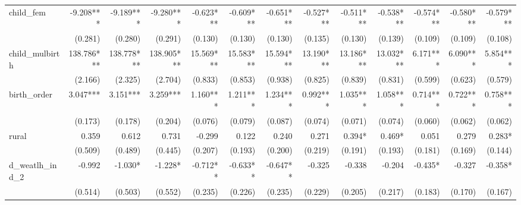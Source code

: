 \begin{tabular}{lrrrrrrrrrrrr}
child\_fem                                  &    -9.208*** &    -9.189*** &    -9.280*** &    -0.623*** &    -0.609*** &    -0.651*** &    -0.527*** &    -0.511*** &    -0.538*** &    -0.574*** &    -0.580*** &    -0.579*** \\ 
                                            &      (0.281) &      (0.280) &      (0.291) &      (0.130) &      (0.130) &      (0.130) &      (0.135) &      (0.130) &      (0.139) &      (0.109) &      (0.109) &      (0.108) \\ 
child\_mulbirth                             &   138.786*** &   138.778*** &   138.905*** &    15.569*** &    15.583*** &    15.594*** &    13.190*** &    13.186*** &    13.032*** &     6.171*** &     6.090*** &     5.854*** \\ 
                                            &      (2.166) &      (2.325) &      (2.704) &      (0.833) &      (0.853) &      (0.938) &      (0.825) &      (0.839) &      (0.831) &      (0.599) &      (0.623) &      (0.579) \\ 
birth\_order                                &     3.047*** &     3.151*** &     3.259*** &     1.160*** &     1.211*** &     1.234*** &     0.992*** &     1.035*** &     1.058*** &     0.714*** &     0.722*** &     0.758*** \\ 
                                            &      (0.173) &      (0.178) &      (0.204) &      (0.076) &      (0.079) &      (0.087) &      (0.074) &      (0.071) &      (0.074) &      (0.060) &      (0.062) &      (0.062) \\ 
rural                                       &        0.359 &        0.612 &        0.731 &       -0.299 &        0.122 &        0.240 &        0.271 &       0.394* &       0.469* &        0.051 &        0.279 &       0.283* \\ 
                                            &      (0.509) &      (0.489) &      (0.445) &      (0.207) &      (0.193) &      (0.200) &      (0.219) &      (0.191) &      (0.193) &      (0.181) &      (0.169) &      (0.144) \\ 
d\_weatlh\_ind\_2                           &       -0.992 &      -1.030* &      -1.228* &     -0.712** &     -0.633** &     -0.647** &       -0.325 &       -0.338 &       -0.204 &      -0.435* &       -0.327 &      -0.358* \\ 
                                            &      (0.514) &      (0.503) &      (0.552) &      (0.235) &      (0.226) &      (0.235) &      (0.229) &      (0.205) &      (0.217) &      (0.183) &      (0.170) &      (0.167) \\ 

\end{tabular}
